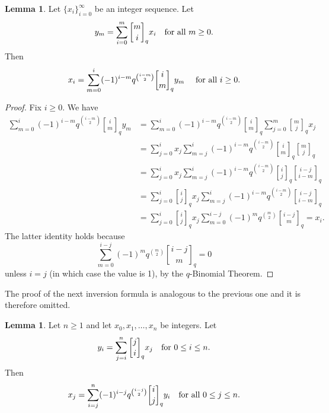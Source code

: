 \documentclass[11pt,a4paper,reqno,twoside]{article}
\theoremstyle{definition}
\newtheorem{lemma}[theorem]{Lemma}
\newcommand{\qbinom}[2]{\genfrac{[}{]}{0pt}{}{#1}{#2}}
\begin{document}
\begin{lemma} \label{first_inversion}
Let $\{x_i\}_{i=0}^\infty$ be an integer sequence.
    Let
    \[
    y_m = \sum_{i=0}^m \qbinom{m}{i}_q x_i \quad \textnormal{for all $m \ge 0$}.
    \]
    Then
    \[
    x_i = \sum_{m=0}^i (-1)^{i-m} q^{\binom{i-m}{2}} \qbinom{i}{m}_q y_m \quad \textnormal{ for all $i \ge 0$}.
    \]
\end{lemma}
\begin{proof}
    Fix $i \ge 0$. We have
    \allowdisplaybreaks
    \[
    \begin{split}
    \sum_{m=0}^i (-1)^{i-m} q^{\binom{i-m}{2}} \qbinom{i}{m}_q y_m &= \sum_{m=0}^i (-1)^{i-m} q^{\binom{i-m}{2}} \qbinom{i}{m}_q \sum_{j=0}^m \qbinom{m}{j}_q x_j \\
    &= \sum_{j=0}^i x_j \sum_{m=j}^i (-1)^{i-m} q^{\binom{i-m}{2}} \qbinom{i}{m}_q  \qbinom{m}{j}_q \\
    &= \sum_{j=0}^i x_j \sum_{m=j}^i (-1)^{i-m} q^{\binom{i-m}{2}} \qbinom{i}{j}_q \qbinom{i-j}{i-m}_q \\
    &= \sum_{j=0}^i \qbinom{i}{j}_q x_j \sum_{m=j}^i (-1)^{i-m} q^{\binom{i-m}{2}}  \qbinom{i-j}{i-m}_q \\
    &= \sum_{j=0}^i \qbinom{i}{j}_q x_j \sum_{m=0}^{i-j} (-1)^m q^{\binom{m}{2}}  \qbinom{i-j}{m}_q =  x_i.
    \end{split}
    \]
    The latter identity holds because
    \[
    \sum_{m=0}^{i-j} (-1)^m q^{\binom{m}{2}}  \qbinom{i-j}{m}_q = 0
    \]
    unless $i = j$ (in which case the value is 1), by the $q$-Binomial Theorem.
\end{proof}

The proof of the next inversion formula is analogous to the previous one and it is therefore omitted.

\begin{lemma} \label{second_inversion}
    Let $n \ge 1$  and let 
    $x_0, x_1, \ldots, x_n$ be integers.
    Let
    \[
    y_i = \sum_{j=i}^n \qbinom{j}{i}_q x_j \quad \textnormal{for $0 \le i \le n$}.
    \]
    Then
    \[
    x_j = \sum_{i=j}^n (-1)^{i-j} q^{\binom{i-j}{2}} \qbinom{i}{j}_q y_i \quad \textnormal{for all $0 \le j \le n$.}
    \]
\end{lemma}
\end{document}
